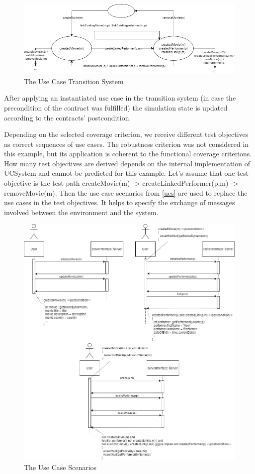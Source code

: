 \begin{figure}[h]
	\centering
	\includegraphics[width=1.0\textwidth]{./images/ucts.png}
	\caption{The Use Case Transition System}
	\label{ucts}
\end{figure}

After applying an instantiated use case in the transition system (in case the precondition of the contract was fulfilled) the simulation state is updated according to the contracts' postcondition. 

Depending on the selected coverage criterion, we receive different test objectives as correct sequences of use cases. The robustness criterion was not considered in this example, but its application is coherent to the functional coverage criterions. How many test objectives are derived depends on the internal implementation of UCSystem and cannot be predicted for this example. Let's assume that one test objective is the test path createMovie(m) -> createLinkedPerformer(p,m) -> removeMovie(m). Then the use case scenarios from \autoref{ucs} are used to replace the use cases in the test objectives. It helps to specify the exchange of messages involved between the environment and the system.

\begin{figure}[h]
	\centering
	\includegraphics[width=1.0\textwidth]{./images/ucs.png}
	\caption{The Use Case Scenarios}
	\label{ucs}
\end{figure}

